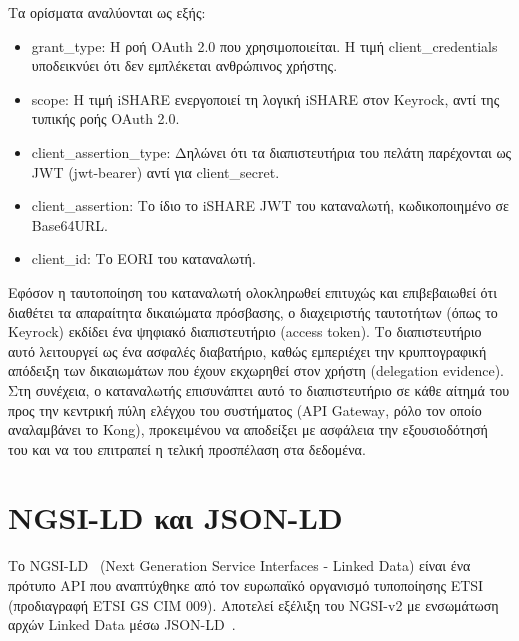 Τα ορίσματα αναλύονται ως εξής:
\begin{itemize}
    \item \textlatin{grant\_type}: Η ροή \textlatin{OAuth 2.0} που
    χρησιμοποιείται. Η τιμή \textlatin{client\_credentials} υποδεικνύει
    ότι δεν εμπλέκεται ανθρώπινος χρήστης.
    \item \textlatin{scope}: Η τιμή \textlatin{iSHARE} ενεργοποιεί τη
    λογική \textlatin{iSHARE} στον \textlatin{Keyrock}, αντί της
    τυπικής ροής \textlatin{OAuth 2.0}.
    \item \textlatin{client\_assertion\_type}: Δηλώνει ότι τα
    διαπιστευτήρια του πελάτη παρέχονται ως \textlatin{JWT}
    (\textlatin{jwt-bearer}) αντί για \textlatin{client\_secret}.
    \item \textlatin{client\_assertion}: Το ίδιο το \textlatin{iSHARE
    JWT} του καταναλωτή, κωδικοποιημένο σε \textlatin{Base64URL}.
    \item \textlatin{client\_id}: Το \textlatin{EORI} του καταναλωτή.
\end{itemize}

Εφόσον η ταυτοποίηση του καταναλωτή ολοκληρωθεί επιτυχώς και επιβεβαιωθεί 
ότι διαθέτει τα απαραίτητα δικαιώματα πρόσβασης, ο διαχειριστής ταυτοτήτων 
(όπως το \textlatin{Keyrock}) εκδίδει ένα ψηφιακό διαπιστευτήριο (\textlatin{access token}).
Το διαπιστευτήριο αυτό λειτουργεί ως ένα ασφαλές διαβατήριο, καθώς εμπεριέχει την 
κρυπτογραφική απόδειξη των δικαιωμάτων που έχουν εκχωρηθεί στον χρήστη 
(\textlatin{delegation evidence}). Στη συνέχεια, ο καταναλωτής επισυνάπτει αυτό 
το διαπιστευτήριο σε κάθε αίτημά του προς την κεντρική πύλη ελέγχου του συστήματος 
(\textlatin{API Gateway}, ρόλο τον οποίο αναλαμβάνει το \textlatin{Kong}), 
προκειμένου να αποδείξει με ασφάλεια την εξουσιοδότησή του και να του 
επιτραπεί η τελική προσπέλαση στα δεδομένα.

\section{\textlatin{NGSI-LD} και \textlatin{JSON-LD}}
\label{sec:ngsi-ld}

Το \textlatin{NGSI-LD}~\cite{ngsi-ld2023} (\textlatin{Next Generation
Service Interfaces - Linked Data}) είναι ένα πρότυπο \textlatin{API}
που αναπτύχθηκε από τον ευρωπαϊκό οργανισμό τυποποίησης
\textlatin{ETSI} (προδιαγραφή \textlatin{ETSI GS CIM 009}). Αποτελεί
εξέλιξη του \textlatin{NGSI-v2} με ενσωμάτωση αρχών
\textlatin{Linked Data} μέσω \textlatin{JSON-LD}~\cite{jsonld2020}.

